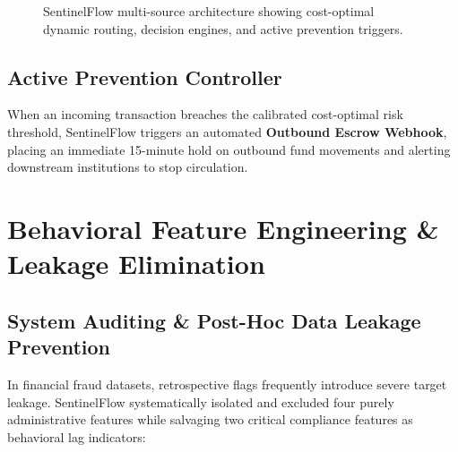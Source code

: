 \documentclass[conference]{IEEEtran}
\begin{document}
\begin{figure}[t]
\caption{SentinelFlow multi-source architecture showing cost-optimal dynamic routing, decision engines, and active prevention triggers.}
\label{fig:arch}
\end{figure}

\subsection{Active Prevention Controller}
When an incoming transaction breaches the calibrated cost-optimal risk threshold, SentinelFlow triggers an automated \textbf{Outbound Escrow Webhook}, placing an immediate 15-minute hold on outbound fund movements and alerting downstream institutions to stop circulation.

\section{Behavioral Feature Engineering \& Leakage Elimination}

\subsection{System Auditing \& Post-Hoc Data Leakage Prevention}
In financial fraud datasets, retrospective flags frequently introduce severe target leakage. SentinelFlow systematically isolated and excluded four purely administrative features while salvaging two critical compliance features as behavioral lag indicators:
\end{document}
